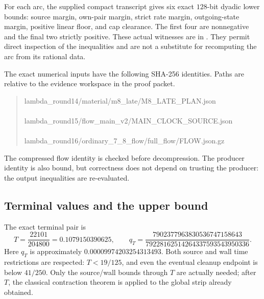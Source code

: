 \documentclass[11pt,a4paper]{article}
\theoremstyle{definition}
\theoremstyle{remark}
\begin{document}
For each arc, the supplied compact transcript gives six exact $128$-bit
dyadic lower bounds: source margin, own-pair margin, strict rate margin,
outgoing-state margin, positive linear floor, and cap clearance.
The first four are nonnegative and the final two strictly positive.
These actual witnesses are in
.
They permit direct inspection of the inequalities and are not a substitute
for recomputing the arc from its rational data.

The exact numerical inputs have the following SHA-256 identities.  Paths
are relative to the evidence workspace in the proof packet.
\begin{quote}\small\ttfamily\raggedright
lambda\_round14/material/m8\_late/M8\_LATE\_PLAN.json\\
\\[3pt]
lambda\_round15/flow\_main\_v2/MAIN\_CLOCK\_SOURCE.json\\
\\[3pt]
lambda\_round16/ordinary\_7\_8\_flow/full\_flow/FLOW.json.gz\\
\end{quote}
The compressed flow identity is checked before decompression.  The
producer identity is also bound, but correctness does not depend on
trusting the producer: the output inequalities are re-evaluated.

\subsection{Terminal values and the upper bound}
\label{flow:terminal}

The exact terminal pair is
\begin{equation}
 T=\frac{22101}{204800}=0.1079150390625,
 \qquad
 q_T=\frac{7902377963830536747158643}{79228162514264337593543950336}.
 \label{flow:terminal-pair}
\end{equation}
Here $q_T$ is approximately $0.00009974203254313493$.  Both source and
wall time restrictions are respected: $T<19/125$, and even the eventual
cleanup endpoint is below $41/250$.  Only the source/wall bounds through
$T$ are actually needed; after $T$, the classical contraction theorem is
applied to the global strip already obtained.
\end{document}
